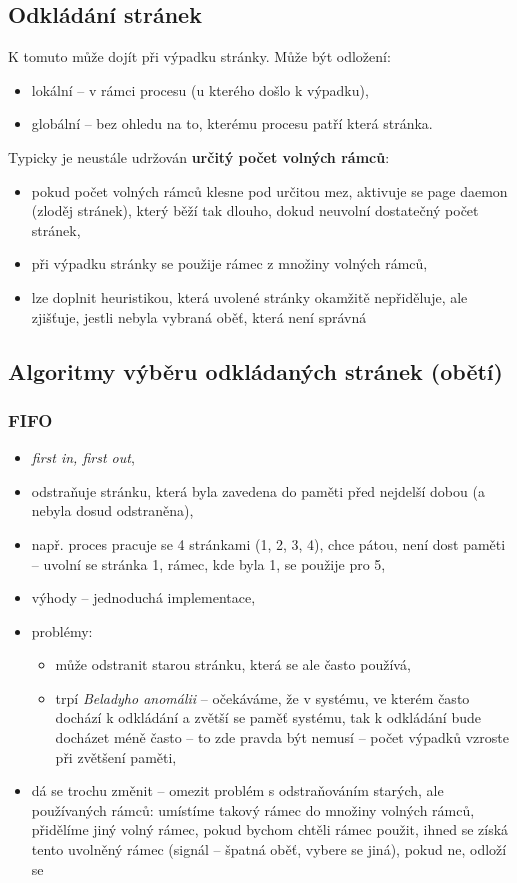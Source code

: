 \documentclass[a4paper, 11pt]{article}
\begin{document}
\subsection{Odkládání stránek}
K tomuto může dojít při výpadku stránky. Může být odložení:
\begin{itemize}
    \item lokální -- v rámci procesu (u kterého došlo k výpadku),
    \item globální -- bez ohledu na to, kterému procesu patří která stránka.
\end{itemize}
 
Typicky je neustále udržován \textbf{určitý počet volných rámců}:
\begin{itemize}
    \item pokud počet volných rámců klesne pod určitou mez, aktivuje se page daemon (zloděj stránek), který běží tak dlouho, dokud neuvolní dostatečný počet stránek,
    \item při výpadku stránky se použije rámec z množiny volných rámců,
    \item lze doplnit heuristikou, která uvolené stránky okamžitě nepřiděluje, ale zjišťuje, jestli nebyla vybraná oběť, která není správná
\end{itemize}

\subsection{Algoritmy výběru odkládaných stránek (obětí)}

\subsubsection{FIFO}
\begin{itemize}
    \item \emph{first in, first out},
    \item odstraňuje stránku, která byla zavedena do paměti před nejdelší dobou (a nebyla dosud odstraněna),
    \item např. proces pracuje se 4 stránkami (1, 2, 3, 4), chce pátou, není dost paměti -- uvolní se stránka 1, rámec, kde byla 1, se použije pro 5,
    \item výhody -- jednoduchá implementace,
    \item problémy:
    \begin{itemize}
        \item může odstranit starou stránku, která se ale často používá,
        \item trpí \emph{Beladyho anomálii} -- očekáváme, že v systému, ve kterém často dochází k odkládání a zvětší se paměť systému, tak k odkládání bude docházet méně často -- to zde pravda být nemusí -- počet výpadků vzroste při zvětšení paměti,
    \end{itemize}
    \item dá se trochu změnit -- omezit problém s odstraňováním starých, ale používaných rámců: umístíme takový rámec do množiny volných rámců, přidělíme jiný volný rámec, pokud bychom chtěli rámec použit, ihned se získá tento uvolněný rámec (signál -- špatná oběť, vybere se jiná), pokud ne, odloží se
\end{itemize}
 
\end{document}
